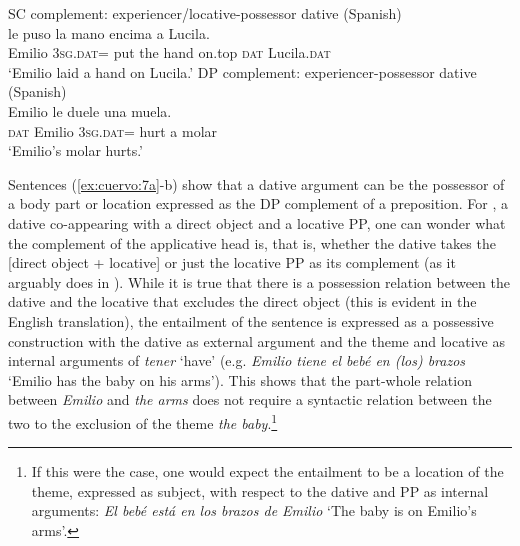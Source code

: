 \documentclass[output=paper,colorlinks,citecolor=brown,nonflat]{./langscibook}
\begin{document}
\ea%
    \label{ex:cuervo:8}
    \ea%
        \label{ex:cuervo:8a}
        SC complement: experiencer/locative-possessor dative   (Spanish)\\
         {le} {puso} {la} {mano} {encima}{\footnotemark} {a} {Lucila}.\\
        Emilio 3\textsc{sg.dat}= put   the hand on.top  \textsc{dat} Lucila.\textsc{dat}\\
        \glt ‘Emilio laid a hand on Lucila.’
    \ex%
        \label{ex:cuervo:8b}
        DP complement: experiencer-possessor dative (Spanish)\\
         {Emilio} {le} {duele} {una} {muela}.\\
        \textsc{dat} Emilio 3\textsc{sg.dat}= hurt a molar\\
        \glt ‘Emilio’s molar hurts.’
    \z
\z

Sentences (\ref{ex:cuervo:7a}-b) show that a dative argument can be the possessor of a body part or location expressed as the DP complement of a preposition. For , a dative co-appearing with a direct object and a locative PP, one can wonder what the complement of the applicative head is, that is, whether the dative takes the [direct object + locative] or just the locative PP as its complement (as it arguably does in ). While it is true that there is a possession relation between the dative and the locative that excludes the direct object (this is evident in the English translation), the entailment of the sentence is expressed as a possessive construction with the dative as external argument and the theme and locative as internal arguments of \textit{tener} ‘have’ (e.g. \textit{Emilio tiene el bebé en (los) brazos} ‘Emilio has the baby on his arms’).  This shows that the part-whole relation between \textit{Emilio} and \textit{the arms} does not require a syntactic relation between the two to the exclusion of the theme \textit{the baby}.\footnote{If this were the case, one would expect the entailment to be a location of the theme, expressed as subject, with respect to the dative and PP as internal arguments: \textit{El bebé está en los brazos de Emilio} ‘The baby is on Emilio’s arms’.}
\end{document}

